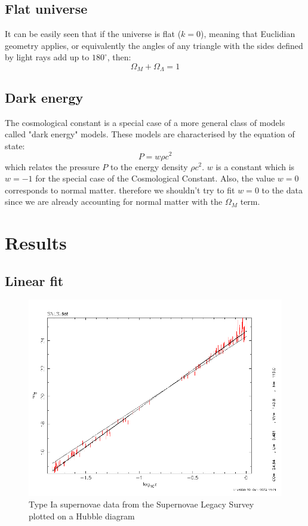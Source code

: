 \documentclass[11pt]{article}
\begin{document}
\subsection{Flat universe}
It can be easily seen that if the universe is flat ($k = 0$), meaning that Euclidian geometry applies, or equivalently the angles of any triangle with the sides defined by light rays add up to $180^\circ$, then: 
\begin{equation}
	\Omega_M + \Omega_\Lambda = 1
	\label{eq:flat}
\end{equation}

\subsection{Dark energy}
The cosmological constant is a special case of a more general class of models called "dark energy" models. These models are characterised by the equation of state:
\begin{equation}
	P = w \rho c^2
	\label{eq:dark}
\end{equation}
which relates the pressure $P$ to the energy density $\rho c^2$. $w$ is a constant which is $w = -1$ for the special case of the Cosmological Constant. Also, the value $w = 0$ corresponds to normal matter. therefore we shouldn't try to fit $w = 0$ to the data since we are already accounting for normal matter with the $\Omega_M$ term. 

\section{Results}
\subsection{Linear fit}
\begin{figure}[htbp]
	\centering
	\includegraphics[width=0.8\linewidth]{snls.png}
	\caption{Type Ia supernovae data from the Supernovae Legacy Survey plotted on a Hubble diagram}
	\label{fig:snls}
\end{figure}
\end{document}
